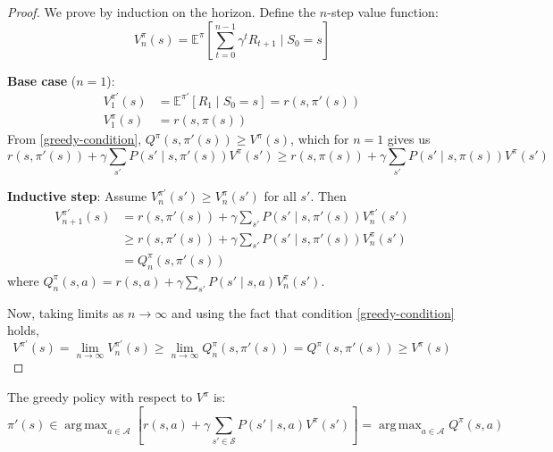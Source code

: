 \documentclass[a4paper, 11pt]{article}
\numberwithin{equation}{section}
\theoremstyle{plain}
\theoremstyle{definition}
\newcommand{\E}{{\mathbb E}}
\newcommand{\1}{{\mathbbm 1}}
\newcommand{\mc}[1]{\mathcal{#1}}
\DeclareMathOperator*{\argmax}{arg\,max}
\begin{document}
	\begin{proof}
		We prove by induction on the horizon. Define the $n$-step value function:
		\begin{equation*}
			V_n^{\pi}(s) = \E^{\pi}\left[\sum_{t=0}^{n-1} \gamma^t R_{t+1} \;|\; S_0 = s\right]
		\end{equation*}
		
		\textbf{Base case} ($n=1$): 
		\begin{equation*}
			\begin{split}
				V_1^{\pi'}(s) &= \E^{\pi'}[R_1\;|\; S_0 = s] = r(s, \pi'(s))\\
				V_1^{\pi}(s) &= r(s, \pi(s))
			\end{split}
		\end{equation*}
		From \eqref{greedy-condition}, $Q^{\pi}(s, \pi'(s)) \geq V^{\pi}(s)$, which for $n=1$ gives us
		\begin{equation*}
			r(s, \pi'(s)) + \gamma \sum_{s'} P(s'\;|\; s, \pi'(s)) V^{\pi}(s') \geq r(s, \pi(s)) + \gamma \sum_{s'} P(s'\;|\; s, \pi(s)) V^{\pi}(s')
		\end{equation*}
		
		\textbf{Inductive step}: Assume $V_n^{\pi'}(s') \geq V_n^{\pi}(s')$ for all $s'$. Then
		\begin{equation*}
			\begin{split}
				V_{n+1}^{\pi'}(s) &= r(s, \pi'(s)) + \gamma \sum_{s'} P(s'\;|\; s, \pi'(s)) V_n^{\pi'}(s')\\
				&\geq r(s, \pi'(s)) + \gamma \sum_{s'} P(s'\;|\; s, \pi'(s)) V_n^{\pi}(s')\\
				&= Q_n^{\pi}(s, \pi'(s))
			\end{split}
		\end{equation*}
		where $Q_n^{\pi}(s, a) = r(s, a) + \gamma \sum_{s'} P(s'\;|\; s, a) V_n^{\pi}(s')$.
		
		Now, taking limits as $n \to \infty$ and using the fact that condition \eqref{greedy-condition} holds,
		\begin{equation*}
			V^{\pi'}(s) = \lim_{n \to \infty} V_n^{\pi'}(s) \geq \lim_{n \to \infty} Q_n^{\pi}(s, \pi'(s)) = Q^{\pi}(s, \pi'(s)) \geq V^{\pi}(s)
		\end{equation*}
	\end{proof}
	
	The greedy policy with respect to $V^{\pi}$ is:
	\begin{equation}
		\pi'(s) \in \argmax_{a \in \mc{A}} \left[ r(s, a) + \gamma \sum_{s' \in \mc{S}} P(s'\;|\; s, a) V^{\pi}(s') \right] = \argmax_{a \in \mc{A}} Q^{\pi}(s, a)
	\end{equation}
	
\end{document}
